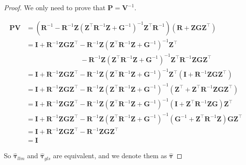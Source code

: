 \documentclass[
  a4paper,
  oneside,
  openany,
  12pt,
  onecolumn]{book}
\theoremstyle{definition}
\theoremstyle{plain}
\theoremstyle{remark}
\begin{document}
\begin{proof}
We only need to prove that \(\boldsymbol{P}=\boldsymbol{V}^{-1}\).

\[\begin{aligned}
\boldsymbol{P}\boldsymbol{V} &=(\boldsymbol{R}^{-1}-\boldsymbol{R}^{-1}\boldsymbol{Z}(\boldsymbol{Z}^\top\boldsymbol{R}^{-1}\boldsymbol{Z}+\boldsymbol{G}^{-1})^{-1}\boldsymbol{Z}^\top\boldsymbol{R}^{-1})(\boldsymbol{R}+\boldsymbol{Z}\boldsymbol{G}\boldsymbol{Z}^\top)\\
&= \boldsymbol{I} + \boldsymbol{R}^{-1}\boldsymbol{Z}\boldsymbol{G}\boldsymbol{Z}^\top - \boldsymbol{R}^{-1}\boldsymbol{Z}(\boldsymbol{Z}^\top\boldsymbol{R}^{-1}\boldsymbol{Z}+\boldsymbol{G}^{-1})^{-1}\boldsymbol{Z}^\top \\
&\quad \quad \quad \quad \quad \quad\quad\quad -\boldsymbol{R}^{-1}\boldsymbol{Z}(\boldsymbol{Z}^\top\boldsymbol{R}^{-1}\boldsymbol{Z}+\boldsymbol{G}^{-1})^{-1}\boldsymbol{Z}^\top\boldsymbol{R}^{-1}\boldsymbol{Z}\boldsymbol{G}\boldsymbol{Z}^\top\\
&=\boldsymbol{I} + \boldsymbol{R}^{-1}\boldsymbol{Z}\boldsymbol{G}\boldsymbol{Z}^\top -\boldsymbol{R}^{-1}\boldsymbol{Z}(\boldsymbol{Z}^\top\boldsymbol{R}^{-1}\boldsymbol{Z}+\boldsymbol{G}^{-1})^{-1}\boldsymbol{Z}^\top(\boldsymbol{I}+\boldsymbol{R}^{-1}\boldsymbol{Z}\boldsymbol{G}\boldsymbol{Z}^\top)\\
&=\boldsymbol{I} + \boldsymbol{R}^{-1}\boldsymbol{Z}\boldsymbol{G}\boldsymbol{Z}^\top -\boldsymbol{R}^{-1}\boldsymbol{Z}(\boldsymbol{Z}^\top\boldsymbol{R}^{-1}\boldsymbol{Z}+\boldsymbol{G}^{-1})^{-1}(\boldsymbol{Z}^\top+\boldsymbol{Z}^\top\boldsymbol{R}^{-1}\boldsymbol{Z}\boldsymbol{G}\boldsymbol{Z}^\top)\\
&= \boldsymbol{I} + \boldsymbol{R}^{-1}\boldsymbol{Z}\boldsymbol{G}\boldsymbol{Z}^\top -\boldsymbol{R}^{-1}\boldsymbol{Z}(\boldsymbol{Z}^\top\boldsymbol{R}^{-1}\boldsymbol{Z}+\boldsymbol{G}^{-1})^{-1}(\boldsymbol{I}+\boldsymbol{Z}^\top\boldsymbol{R}^{-1}\boldsymbol{Z}\boldsymbol{G})\boldsymbol{Z}^\top\\
&= \boldsymbol{I} + \boldsymbol{R}^{-1}\boldsymbol{Z}\boldsymbol{G}\boldsymbol{Z}^\top -\boldsymbol{R}^{-1}\boldsymbol{Z}(\boldsymbol{Z}^\top\boldsymbol{R}^{-1}\boldsymbol{Z}+\boldsymbol{G}^{-1})^{-1}(\boldsymbol{G}^{-1}+\boldsymbol{Z}^\top\boldsymbol{R}^{-1}\boldsymbol{Z})\boldsymbol{G}\boldsymbol{Z}^\top\\
&= \boldsymbol{I}+\boldsymbol{R}^{-1}\boldsymbol{Z}\boldsymbol{G}\boldsymbol{Z}^\top-\boldsymbol{R}^{-1}\boldsymbol{Z}\boldsymbol{G}\boldsymbol{Z}^\top\\
& = \boldsymbol{I}
\end{aligned}\]

So \(\hat{\boldsymbol{\tau}}_{llm}\) and
\(\hat{\boldsymbol{\tau}}_{gls}\) are equivalent, and we denote them as
\(\hat{\boldsymbol{\tau}}\)
\end{proof}
\end{document}
